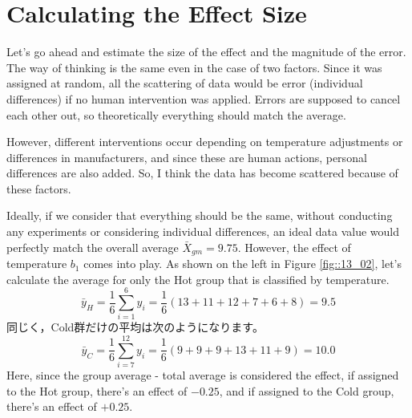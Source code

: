 \documentclass{ltjbook}
\begin{document}
\section{Calculating the Effect Size}

Let's go ahead and estimate the size of the effect and the magnitude of the error. The way of thinking is the same even in the case of two factors.
Since it was assigned at random, all the scattering of data would be error (individual differences) if no human intervention was applied. Errors are supposed to cancel each other out, so theoretically everything should match the average.

However, different interventions occur depending on temperature adjustments or differences in manufacturers, and since these are human actions, personal differences are also added. So, I think the data has become scattered because of these factors.

Ideally, if we consider that everything should be the same, without conducting any experiments or considering individual differences, an ideal data value would perfectly match the overall average $\bar{X}_{gm} = 9.75$. However, the effect of temperature $b_1$ comes into play. As shown on the left in Figure \ref{fig::13_02}, let's calculate the average for only the Hot group that is classified by temperature.
\[ \bar{y}_{H} = \frac{1}{6}\sum_{i=1}^6 y_i = \frac{1}{6} (13+11+12+7+6+8)= 9.5 \]
同じく，Cold群だけの平均は次のようになります。
\[ \bar{y}_{C} = \frac{1}{6}\sum_{i=7}^{12}y_i = \frac{1}{6}(9+9+9+13+11+9) = 10.0 \]
Here, since the group average - total average is considered the effect, if assigned to the Hot group, there's an effect of $-0.25$, and if assigned to the Cold group, there's an effect of $+0.25$.
\end{document}
